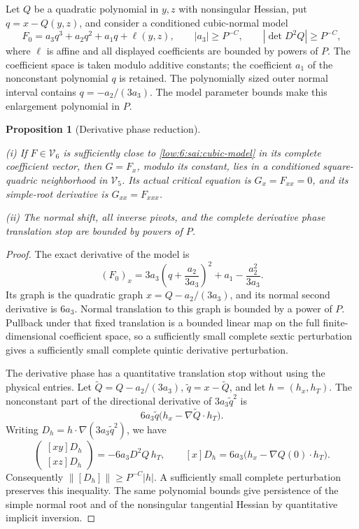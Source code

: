 \documentclass[11pt]{amsart}
\newtheorem{proposition}[theorem]{Proposition}
\theoremstyle{definition}
\theoremstyle{remark}
\numberwithin{equation}{section}
\begin{document}
Let $Q$ be a quadratic polynomial in $y,z$ with nonsingular Hessian, put $q=x-Q(y,z)$, and consider a conditioned cubic-normal model
\begin{equation}\label{low:6:sai:cubic-model}
F_0=a_3q^3+a_2q^2+a_1q+\ell(y,z),\qquad |a_3|\ge P^{-C},\qquad |\det D^2Q|\ge P^{-C},
\end{equation}
where $\ell$ is affine and all displayed coefficients are bounded by powers of $P$. The coefficient space is taken modulo additive constants; the coefficient $a_1$ of the nonconstant polynomial $q$ is retained. The polynomially sized outer normal interval contains $q=-a_2/(3a_3)$. The model parameter bounds make this enlargement polynomial in $P$.

\begin{proposition}[Derivative phase reduction]\label{low:6:sai:derivative-reduction}

\noindent\textup{(i)} If $F\in\mathcal V_6$ is sufficiently close to \eqref{low:6:sai:cubic-model} in its complete coefficient vector, then $G=F_x$, modulo its constant, lies in a conditioned square-quadric neighborhood in $\mathcal V_5$. Its actual critical equation is $G_x=F_{xx}=0$, and its simple-root derivative is $G_{xx}=F_{xxx}$.

\noindent\textup{(ii)} The normal shift, all inverse pivots, and the complete derivative phase translation stop are bounded by powers of $P$.
\end{proposition}
\begin{proof}
The exact derivative of the model is
\[
(F_0)_x=3a_3\left(q+\frac{a_2}{3a_3}\right)^2+a_1-\frac{a_2^2}{3a_3}.
\]
Its graph is the quadratic graph $x=Q-a_2/(3a_3)$, and its normal second derivative is $6a_3$. Normal translation to this graph is bounded by a power of $P$. Pullback under that fixed translation is a bounded linear map on the full finite-dimensional coefficient space, so a sufficiently small complete sextic perturbation gives a sufficiently small complete quintic derivative perturbation.

The derivative phase has a quantitative translation stop without using the physical entries. Let $\widetilde Q=Q-a_2/(3a_3)$, $\widetilde q=x-\widetilde Q$, and let $h=(h_x,h_T)$. The nonconstant part of the directional derivative of $3a_3\widetilde q^2$ is
\[
6a_3\widetilde q\bigl(h_x-\nabla\widetilde Q\cdot h_T\bigr).
\]
Writing $D_h=h\cdot\nabla(3a_3\widetilde q^2)$, we have
\[
\begin{pmatrix}[xy]D_h\\{[xz]D_h}\end{pmatrix}=-6a_3D^2Q\,h_T,\qquad [x]D_h=6a_3\bigl(h_x-\nabla Q(0)\cdot h_T\bigr).
\]
Consequently $\|[D_h]\|\ge P^{-C}|h|$. A sufficiently small complete perturbation preserves this inequality. The same polynomial bounds give persistence of the simple normal root and of the nonsingular tangential Hessian by quantitative implicit inversion.
\end{proof}
\end{document}
